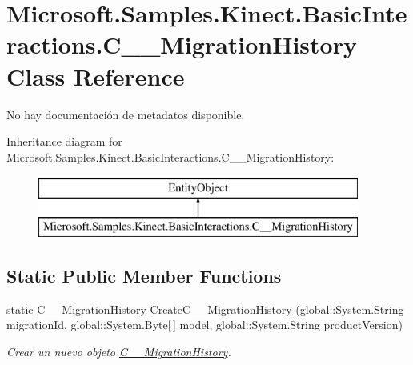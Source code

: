 \hypertarget{class_microsoft_1_1_samples_1_1_kinect_1_1_basic_interactions_1_1_c_____migration_history}{\section{Microsoft.\-Samples.\-Kinect.\-Basic\-Interactions.\-C\-\_\-\-\_\-\-Migration\-History Class Reference}
\label{class_microsoft_1_1_samples_1_1_kinect_1_1_basic_interactions_1_1_c_____migration_history}
}


No hay documentación de metadatos disponible.  


Inheritance diagram for Microsoft.\-Samples.\-Kinect.\-Basic\-Interactions.\-C\-\_\-\-\_\-\-Migration\-History\-:\begin{figure}[H]
\begin{center}
\leavevmode
\includegraphics[height=2.000000cm]{class_microsoft_1_1_samples_1_1_kinect_1_1_basic_interactions_1_1_c_____migration_history}
\end{center}
\end{figure}
\subsection*{Static Public Member Functions}
\begin{DoxyCompactItemize}
\item 
static \hyperlink{class_microsoft_1_1_samples_1_1_kinect_1_1_basic_interactions_1_1_c_____migration_history}{C\-\_\-\-\_\-\-Migration\-History} \hyperlink{class_microsoft_1_1_samples_1_1_kinect_1_1_basic_interactions_1_1_c_____migration_history_ad4d788f5a6e38ade74b1b74e2c9eb2fa}{Create\-C\-\_\-\-\_\-\-Migration\-History} (global\-::\-System.\-String migration\-Id, global\-::\-System.\-Byte\mbox{[}$\,$\mbox{]} model, global\-::\-System.\-String product\-Version)
\begin{DoxyCompactList}\small\item\em Crear un nuevo objeto \hyperlink{class_microsoft_1_1_samples_1_1_kinect_1_1_basic_interactions_1_1_c_____migration_history}{C\-\_\-\-\_\-\-Migration\-History}. \end{DoxyCompactList}\end{DoxyCompactItemize}

